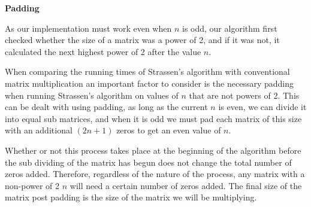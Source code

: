 \documentclass[12pt]{article}
\begin{document}
\bigskip

\noindent \textbf{Padding}
\bigskip

\noindent As our implementation must work even when $n$ is odd, our algorithm first checked whether the size of a matrix was a power of 2, and if it was not, it calculated the next highest power of 2 after the value $n$.  
\medskip

\noindent When comparing the running times of Strassen's algorithm with conventional matrix multiplication an important factor to consider is the necessary padding when running Strassen's algorithm on values of $n$ that are not powers of 2.  This can be dealt with using padding, as long as the current $n$ is even, we can divide it into equal sub matrices, and when it is odd we must pad each matrix of this size with an additional $(2n+1)$ zeros to get an even value of $n$.
\medskip

\noindent Whether or not this process takes place at the beginning of the algorithm before the sub dividing of the matrix has begun does not change the total number of zeros added.  Therefore, regardless of the nature of the process, any matrix with a non-power of 2 $n$ will need a certain number of zeros added.  The final size of the matrix post padding is the size of the matrix we will be multiplying.
\medskip
\end{document}
